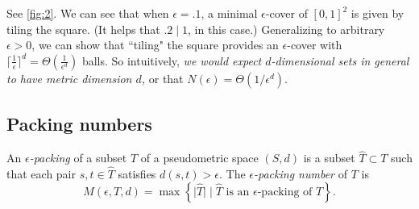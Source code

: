 \documentclass[11pt]{article}
\begin{document}
See \cref{fig:2}. We can see that when $\epsilon = .1$, a minimal $\epsilon$-cover of $[0,1]^2$ is
given by tiling the square. (It helps that $.2 \mid 1$, in this case.) 
Generalizing to arbitrary $\epsilon > 0$, we can show that
``tiling" the square provides an $\epsilon$-cover with $\lceil \frac{1}{\epsilon}
\rceil^d = \Theta\left(\frac{1}{\epsilon^d}\right)$ 
balls.
So intuitively, \emph{we would expect $d$-dimensional sets in general to have metric dimension $d$,}
or that $N(\epsilon) = \Theta(1/\epsilon^d)$.


\subsection{Packing numbers}
\begin{definition}
  An \emph{$\epsilon$-packing} of a subset $T$ of a pseudometric space $(S,d)$ is a subset 
  $\widehat{T} \subset T$ such that each pair $s,t \in \widehat{T}$ satisfies
  $d(s,t) > \epsilon$. The \emph{$\epsilon$-packing number} of $T$ is 
  $$
  M(\epsilon, T, d) = \max\left\{
    \big|\widehat{T}\big| \mid \widehat{T} \text{ is an }\epsilon\text{-packing of }T 
  \right\}.
  $$
\end{definition}
\end{document}
